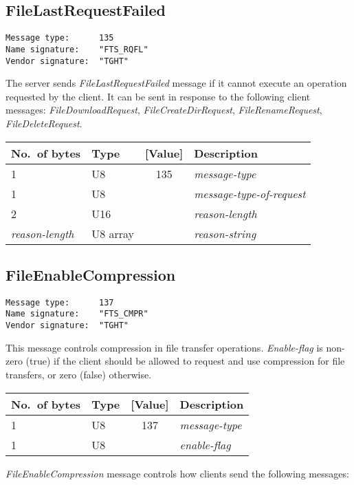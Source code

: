 \documentclass[a4paper]{article}
\newcommand{\typestr}[1]{\textit{#1}}
\begin{document}
\newpage
\subsection{FileLastRequestFailed}
\begin{verbatim}
Message type:      135
Name signature:    "FTS_RQFL"
Vendor signature:  "TGHT"
\end{verbatim}

The server sends \typestr{FileLastRequestFailed} message if it cannot
execute an operation requested by the client. It can be sent in
response to the following client messages:
\typestr{FileDownloadRequest}, \typestr{FileCreateDirRequest},
\typestr{FileRenameRequest}, \typestr{FileDeleteRequest}.

\begin{tabular}{l|lc|l} \hline
No.\ of bytes & Type & [Value] & Description \\ \hline
1 & U8  & 135 & \typestr{message-type} \\
1 & U8  &     & \typestr{message-type-of-request} \\
2 & U16 &     & \typestr{reason-length} \\
\typestr{reason-length} & U8 array & & \typestr{reason-string} \\
\hline\end{tabular}


\newpage
\subsection{FileEnableCompression}
\begin{verbatim}
Message type:      137
Name signature:    "FTS_CMPR"
Vendor signature:  "TGHT"
\end{verbatim}

This message controls compression in file transfer operations.
\typestr{Enable-flag} is non-zero (true) if the client should be
allowed to request and use compression for file transfers, or zero
(false) otherwise.

\begin{tabular}{l|lc|l} \hline
No.\ of bytes & Type & [Value] & Description \\ \hline
1 & U8  & 137 & \typestr{message-type} \\
1 & U8  &     & \typestr{enable-flag} \\
\hline\end{tabular}

\typestr{FileEnableCompression} message controls how clients send the
following messages:
\end{document}
